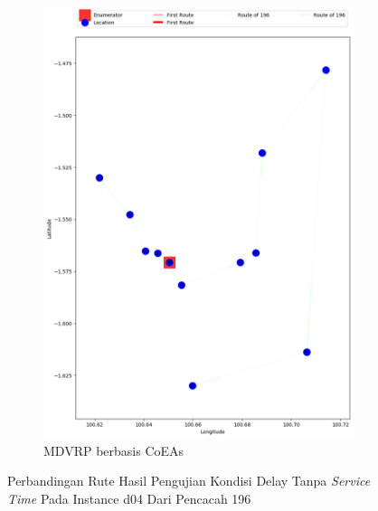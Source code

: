 \begin{figure}[H]
	\centering
	\begin{subfigure}[t]{\textwidth}
		\centering
		\includegraphics[width=\textwidth]{Resources/Images/delayed_4/real_m15_n100_delayed_4_196_coes}
		\caption{MDVRP berbasis CoEAs}
		\label{fig:real_m15_n100_delayed_4_196_coes}
	\end{subfigure}
	\caption{Perbandingan Rute Hasil Pengujian Kondisi Delay Tanpa \textit{Service Time} Pada Instance d04 Dari Pencacah 196}
	\label{fig:real_m15_n100_delayed_4_196}
\end{figure}


